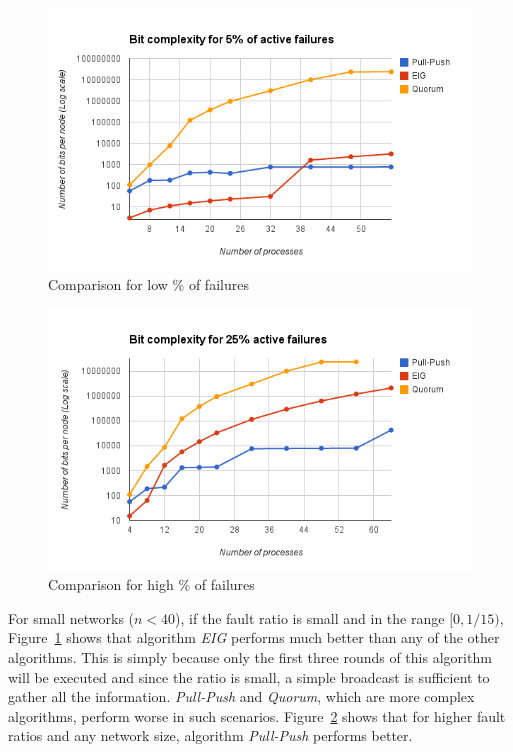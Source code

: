 \begin{figure}[ht] \centering  \includegraphics[scale=0.4]{Fault5}
     \caption{Comparison for low \% of failures}
    \label{fig:fault5}  \end{figure}

\begin{figure}[ht] \centering 
    \includegraphics[scale=0.4]{Fault25}  \caption{Comparison for
    high \% of failures} \label{fig:fault25} \end{figure}

For small networks ($n < 40$), if the fault ratio is small and in the range
$[0, 1/15)$, Figure~\ref{fig:fault5} shows that algorithm \textit{EIG} performs
    much better than any of the other algorithms. This is simply because only
    the first three rounds of this algorithm will be executed and since the
    ratio is small, a simple broadcast is sufficient to gather all the
    information. \textit{Pull-Push} and \textit{Quorum}, which are more complex
    algorithms, perform worse in such scenarios. Figure~\ref{fig:fault25} shows
    that for higher fault ratios and any network size, algorithm
    \textit{Pull-Push} performs better.

